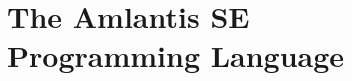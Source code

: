 
\part[The Amlantis SE Programming Language]{The Amlantis SE \\Programming Language \\ \vspace{1cm} }
\label{part:language-se}
















